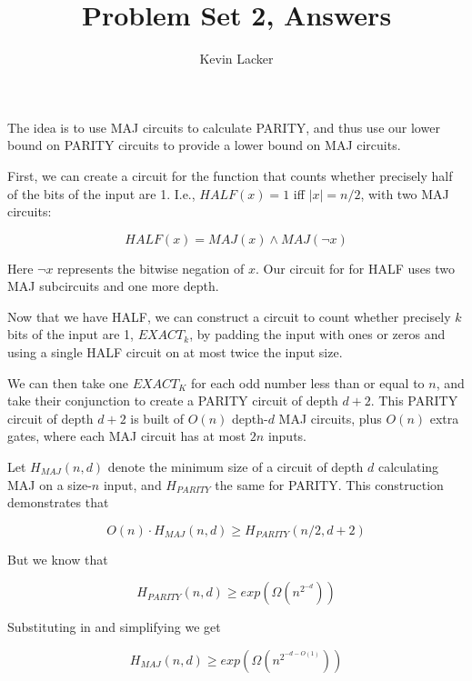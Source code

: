 \documentclass{article}
\newenvironment{problem}[2][Problem]{\begin{trivlist}
\item[\hskip \labelsep {\bfseries #1}\hskip \labelsep {\bfseries #2.}]}{\end{trivlist}}
\begin{document}
\title{Problem Set 2, Answers}
\author{Kevin Lacker}
\maketitle

\begin{problem}{1}
  The idea is to use MAJ circuits to calculate PARITY, and thus use
  our lower bound on PARITY circuits to provide a lower bound on MAJ
  circuits.
  
  First, we can create a circuit for the function that counts whether
  precisely half of the bits of the input are 1. I.e., $HALF(x) = 1$ iff
  $|x| = n / 2$, with two MAJ circuits:

  \begin{equation}
    HALF(x) = MAJ(x) \wedge MAJ(\neg x)
  \end{equation}

  Here $\neg x$ represents the bitwise negation of $x$. Our circuit for
  for HALF uses two MAJ subcircuits and one more depth.

  Now that we have HALF, we can construct a circuit to count whether
  precisely $k$ bits of the input are 1, $EXACT_k$, by padding the input with
  ones or zeros and using a single HALF circuit on at most twice the
  input size.

  We can then take one $EXACT_K$ for each odd number less than or
  equal to $n$, and take their conjunction to create a PARITY circuit
  of depth $d+2$. This PARITY circuit of depth $d+2$ is built of
  $O(n)$ depth-$d$ MAJ circuits, plus $O(n)$ extra gates, where each
  MAJ circuit has at most $2n$ inputs.

  Let $H_{MAJ}(n, d)$ denote the minimum size of a circuit of depth
  $d$ calculating MAJ on a size-$n$ input, and $H_{PARITY}$ the same
  for PARITY. This construction demonstrates that

  \begin{equation}
    O(n) \cdot H_{MAJ}(n, d) \geq H_{PARITY}(n/2, d + 2)
  \end{equation}

  But we know that

  \begin{equation}
    H_{PARITY}(n, d) \geq exp(\Omega(n^{2^{-d}}))
  \end{equation}

  Substituting in and simplifying we get

  \begin{equation}
    H_{MAJ}(n, d) \geq exp(\Omega(n^{2^{-d-O(1)}}))
  \end{equation}
  
\end{problem}
\end{document}
